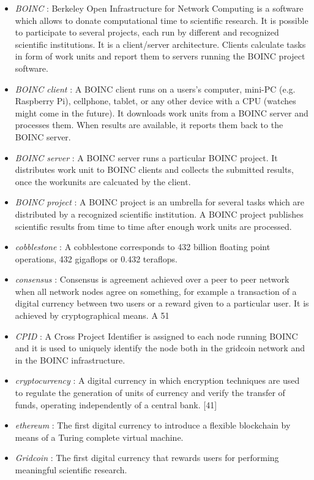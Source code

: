 \begin{itemize}
  \item \textit{BOINC} : Berkeley Open Infrastructure for Network Computing is a software which allows to donate computational time to scientific research. It is possible to participate to several projects, each run by different and recognized scientific institutions. It is a client/server architecture. Clients calculate tasks in form of work units and report them to servers running the BOINC project software.
  \item \textit{BOINC client} : A BOINC client runs on a users's computer, mini-PC (e.g. Raspberry Pi), cellphone, tablet, or any other device with a CPU (watches might come in the future). It downloads work units from a BOINC server and processes them. When results are available, it reports them back to the BOINC server.
  \item \textit{BOINC server} : A BOINC server runs a particular BOINC project. It distributes work unit to BOINC clients and collects the submitted results, once the workunits are calcuated by the client.
  \item \textit{BOINC project} : A BOINC project is an umbrella for several tasks which are distributed by a recognized scientific institution. A BOINC project publishes scientific results from time to time after enough work units are processed.
  \item \textit{cobblestone} : A cobblestone corresponds to 432 billion floating point operations, 432 gigaflops or 0.432 teraflops.
  \item \textit{consensus} : Consensus is agreement achieved over a peer to peer network when all network nodes agree on something, for example a transaction of a digital currency between two users or a reward given to a particular user. It is achieved by cryptographical means. A 51%
  \item \textit{CPID} : A Cross Project Identifier is assigned to each node running BOINC and it is used to uniquely identify the node both in the gridcoin network and in the BOINC infrastructure.
  \item \textit{cryptocurrency} : A digital currency in which encryption techniques are used to regulate the generation of units of currency and verify the transfer of funds, operating independently of a central bank. [41]
  \item \textit{ethereum} : The first digital currency to introduce a flexible blockchain by means of a Turing complete virtual machine.
  \item \textit{Gridcoin} : The first digital currency that rewards users for performing meaningful scientific research.

\end{itemize}
